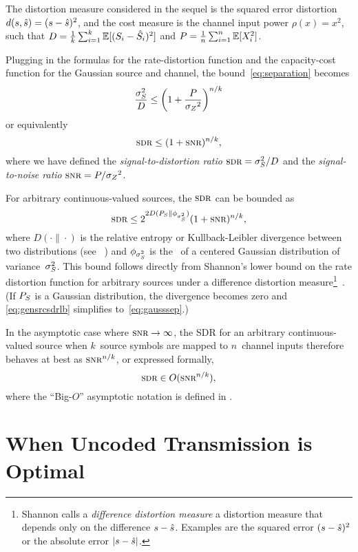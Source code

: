 The distortion measure considered in the sequel is the squared error distortion
$d(s,{\hat{s}}) = (s - {\hat{s}})^2$, and the cost measure is the channel input power
$\rho(x) = x^2$, such that $D = \frac1k \sum_{i=1}^k \mathbb{E}[(S_i - {\hat{S}}_i)^2]$ and $P
= \frac1n \sum_{i=1}^n \mathbb{E}[X_i^2]$.

Plugging in the formulas for the rate-distortion function and the capacity-cost
function for the Gaussian source and channel, the bound~\eqref{eq:separation}
becomes
\begin{equation}
  \label{eq:gausssep}
  \frac{{\sigma_S^2}}{D} \le \left( 1 + \frac{P}{{{\sigma_Z}^2}} \right)^{n/k}
\end{equation}
or equivalently
\begin{equation}
  \label{eq:gausssepsdr}
  \sdr \le (1 + \snr)^{n/k},
\end{equation}
where we have defined the \emph{signal-to-distortion ratio} $\sdr = \ssq/D$ and
the \emph{signal-to-noise ratio} $\snr = P/\szq$. 

For arbitrary continuous-valued sources, the $\sdr$ can be bounded as
\begin{equation}
  \label{eq:gensrcsdrlb}
  \sdr \le 2^{2 D(\ps \| \phi_{\ssq})} (1 + \snr)^{n/k},
\end{equation}
where $D(\cdot\|\cdot)$ is the relative entropy or Kullback-Leibler divergence
between two distributions (see \eg~\cite{CoverT1991}) and $\phi_{{\sigma_S^2}}$ is the
\pdf\ of a centered Gaussian distribution of variance~${\sigma_S^2}$. This bound
follows directly from Shannon's lower bound on the rate distortion function for
arbitrary sources under a difference distortion measure\footnote{Shannon calls a
\emph{difference distortion measure} a distortion measure that depends only on
the difference $s - {\hat{s}}$. Examples are the squared error $(s-{\hat{s}})^2$ or the
absolute error $|s - {\hat{s}}|$.}~\cite{Shannon1959}.
(If ${P_S}$ is a Gaussian distribution, the divergence becomes zero and
\eqref{eq:gensrcsdrlb} simplifies to~\eqref{eq:gausssep}.) 

In the asymptotic case where $\snr \ra \infty$, the SDR for an arbitrary
continuous-valued source when $k$~source symbols are mapped to $n$~channel
inputs therefore behaves at best as $\snr^{n/k}$, or expressed formally,
\[ \sdr \in O(\snr^{n/k}), \]
where the ``Big-$O$'' asymptotic notation is defined in .


\section{When Uncoded Transmission is Optimal}\label{sec:gaussuncoded}

